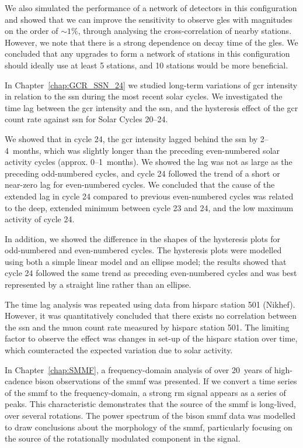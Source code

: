We also simulated the performance of a network of detectors in this configuration and showed that we can improve the sensitivity to observe \glspl{gle} with magnitudes on the order of $\sim 1 \%$, through analysing the cross-correlation of nearby stations. However, we note that there is a strong dependence on decay time of the \glspl{gle}. We concluded that any upgrades to form a network of stations in this configuration should ideally use at least 5 stations, and 10 stations would be more beneficial.


\vspace{2em}


In Chapter~\ref{chap:GCR_SSN_24} we studied long-term variations of \gls{gcr} intensity in relation to the \gls{ssn} during the most recent solar cycles. We investigated the time lag between the \gls{gcr} intensity and the \gls{ssn}, and the hysteresis effect of the \gls{gcr} count rate against \gls{ssn} for Solar Cycles 20--24.

We showed that in cycle 24, the \gls{gcr} intensity lagged behind the \gls{ssn} by 2--4~months, which was slightly longer than the preceding even-numbered solar activity cycles (approx. 0--1~months). We showed the lag was not as large as the preceding odd-numbered cycles, and cycle 24 followed the trend of a short or near-zero lag for even-numbered cycles. We concluded that the cause of the extended lag in cycle 24 compared to previous even-numbered cycles was related to the deep, extended minimum between cycle 23 and 24, and the low maximum activity of cycle 24.

In addition, we showed the difference in the shapes of the hysteresis plots for odd-numbered and even-numbered cycles. The hysteresis plots were modelled using both a simple linear model and an ellipse model; the results showed that cycle 24 followed the same trend as preceding even-numbered cycles and was best represented by a straight line rather than an ellipse.

The time lag analysis was repeated using data from \gls{hisparc} station 501 (Nikhef). However, it was quantitatively concluded that there exists no correlation between the \gls{ssn} and the muon count rate measured by \gls{hisparc} station 501. The limiting factor to observe the effect was changes in set-up of the \gls{hisparc} station over time, which counteracted the expected variation due to solar activity.


\vspace{2em}


In Chapter~\ref{chap:SMMF}, a frequency-domain analysis of over 20~years of high-cadence \gls{bison} observations of the \gls{smmf} was presented. If we convert a time series of the \gls{smmf} to the frequency-domain, a strong \gls{rm} signal appears as a series of peaks. This characteristic demonstrates that the source of the \gls{smmf} is long-lived, over several rotations. The power spectrum of the \gls{bison} \gls{smmf} data was modelled to draw conclusions about the morphology of the \gls{smmf}, particularly focusing on the source of the rotationally modulated component in the signal.

